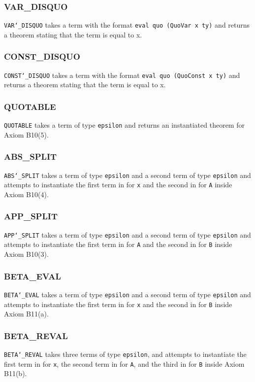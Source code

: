 \documentclass{article}
\def\c#1{\texttt{#1}}
\begin{document}
\subsubsection{VAR\_DISQUO}
\c{VAR\char`\_DISQUO} takes a term with the format \c{eval quo (QuoVar x ty)} and returns a theorem stating that the term is equal to x.

\subsubsection{CONST\_DISQUO}
\c{CONST\char`\_DISQUO} takes a term with the format \c{eval quo (QuoConst x ty)} and returns a theorem stating that the term is equal to x.

\subsubsection{QUOTABLE}
\c{QUOTABLE} takes a term of type \c{epsilon} and returns an instantiated theorem for Axiom B10(5).

\subsubsection{ABS\_SPLIT}
\c{ABS\char`\_SPLIT} takes a term of type \c{epsilon} and a second term of type \c{epsilon} and attempts to instantiate the first term in for \c{x} and the second in for \c{A} inside Axiom B10(4).

\subsubsection{APP\_SPLIT}
\c{APP\char`\_SPLIT} takes a term of type \c{epsilon} and a second term of type \c{epsilon} and attempts to instantiate the first term in for \c{A} and the second in for \c{B} inside Axiom B10(3).

\subsubsection{BETA\_EVAL}
\c{BETA\char`\_EVAL} takes a term of type \c{epsilon} and a second term of type \c{epsilon} and attempts to instantiate the first term in for \c{x} and the second in for \c{B} inside Axiom B11(a).

\subsubsection{BETA\_REVAL}
\c{BETA\char`\_REVAL} takes three terms of type \c{epsilon}, and attempts to instantiate the first term in for \c{x}, the second term in for \c{A}, and the third in for \c{B} inside Axiom B11(b).
\end{document}
